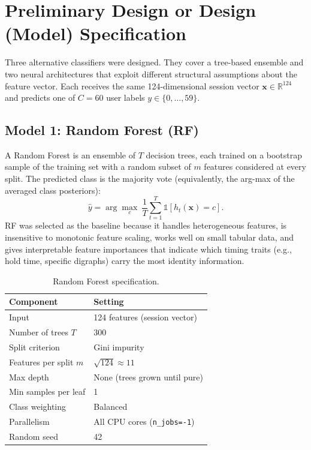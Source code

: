\section{Preliminary Design or Design (Model) Specification}
\label{sec:design}

Three alternative classifiers were designed. They cover a tree-based ensemble and two neural architectures that exploit different structural assumptions about the feature vector. Each receives the same 124-dimensional session vector $\mathbf{x}\in\mathbb{R}^{124}$ and predicts one of $C=60$ user labels $y\in\{0,\dots,59\}$.

\subsection{Model 1: Random Forest (RF)}
A Random Forest is an ensemble of $T$ decision trees, each trained on a bootstrap sample of the training set with a random subset of $m$ features considered at every split. The predicted class is the majority vote (equivalently, the arg-max of the averaged class posteriors):
\begin{equation}
\hat{y}=\arg\max_{c}\ \frac{1}{T}\sum_{t=1}^{T}\mathbb{1}\left[h_t(\mathbf{x})=c\right].
\end{equation}
RF was selected as the baseline because it handles heterogeneous features, is insensitive to monotonic feature scaling, works well on small tabular data, and gives interpretable feature importances that indicate which timing traits (e.g., hold time, specific digraphs) carry the most identity information.

\begin{table}[H]
\centering
\caption{Random Forest specification.}
\begin{tabular}{@{}ll@{}}
\toprule
\textbf{Component} & \textbf{Setting} \\ \midrule
Input & 124 features (session vector) \\
Number of trees $T$ & 300 \\
Split criterion & Gini impurity \\
Features per split $m$ & $\sqrt{124}\approx 11$ \\
Max depth & None (trees grown until pure) \\
Min samples per leaf & 1 \\
Class weighting & Balanced \\
Parallelism & All CPU cores (\texttt{n\_jobs=-1}) \\
Random seed & 42 \\ \bottomrule
\end{tabular}
\end{table}

